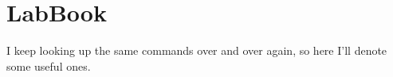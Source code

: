 \documentclass[ a4paper]{article}
\begin{document}
    \section{LabBook}
    I keep looking up the same commands over and over again, so here I'll denote some useful ones.

    
    
    
    
    
\end{document}
